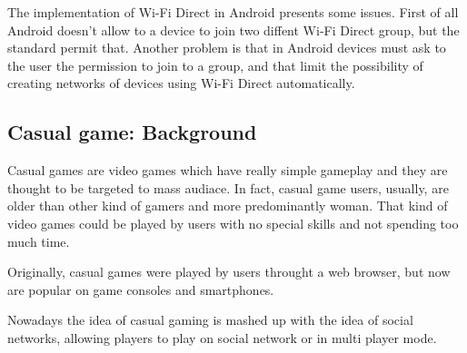 The implementation of Wi-Fi Direct in Android presents some issues. First of all
Android doesn't allow to a device to join two diffent Wi-Fi Direct group, but 
the standard permit that. Another problem is that in Android devices must ask 
to the user the permission to join to a group, and that limit the possibility
of creating networks of devices using Wi-Fi Direct automatically.

\subsection{Casual game: Background}
Casual games are video games which have really simple gameplay and they are
thought to be targeted to mass audiace. In fact, casual game users, usually, are
older than other kind of gamers and more predominantly woman. That kind of video
games could be played by users with no special skills and not spending too much 
time.

Originally, casual games were played by users throught a web browser, but now 
are popular on game consoles and smartphones.

Nowadays the idea of casual gaming is mashed up with the idea of social networks,
allowing players to play on social network or in multi player mode.